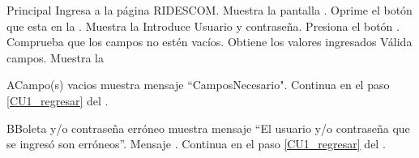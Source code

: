     \begin{UCtrayectoria}{Principal}
    \UCpaso[\UCactor] Ingresa a la página RIDESCOM.
    \UCpaso Muestra la pantalla .
    \UCpaso[\UCactor] Oprime el botón  que esta en la .
    \UCpaso Muestra la 
	\UCpaso[\UCactor] Introduce Usuario y contraseña. \label{CU1_regresar} 
    \UCpaso[\UCactor] Presiona el botón .
    \UCpaso Comprueba que los campos no estén vacíos. 
    \UCpaso Obtiene los valores ingresados
    \UCpaso Válida campos. 
    \UCpaso Muestra la 
    \end{UCtrayectoria}
    
    \begin{UCtrayectoriaA}{A}{Campo(s) vacios}
    	\UCpaso muestra mensaje “CamposNecesario".
    	\UCpaso Continua en el paso \ref{CU1_regresar} del .
    \end{UCtrayectoriaA}

	\begin{UCtrayectoriaA}{B}{Boleta y/o contraseña erróneo}
		\UCpaso muestra mensaje “El usuario y/o contraseña que se ingresó son erróneos”. Mensaje .
   		\UCpaso Continua en el paso \ref{CU1_regresar} del .
	\end{UCtrayectoriaA}

	


